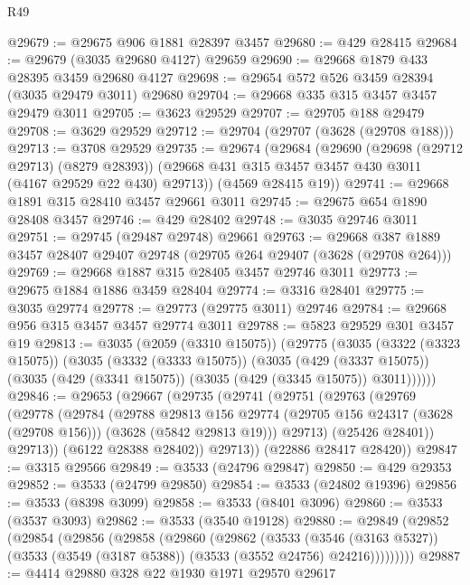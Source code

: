 \begin{lexlean}{R49}
\begin{coremodule}
@29679 := @29675 @906 @1881 @28397 @3457
@29680 := @429 @28415
@29684 := @29679 (@3035 @29680 @4127) @29659
@29690 := @29668 @1879 @433 @28395 @3459 @29680 @4127
@29698 := @29654 @572 @526 @3459 @28394 (@3035 @29479 @3011) @29680
@29704 := @29668 @335 @315 @3457 @3457 @29479 @3011
@29705 := @3623 @29529
@29707 := @29705 @188 @29479
@29708 := @3629 @29529
@29712 := @29704 (@29707 (@3628 (@29708 @188)))
@29713 := @3708 @29529
@29735 := @29674
    (@29684
      (@29690
        (@29698 (@29712 @29713) (@8279 @28393))
        (@29668 @431 @315 @3457 @3457 @430 @3011 (@4167 @29529 @22 @430) @29713))
      (@4569 @28415 @19))
@29741 := @29668 @1891 @315 @28410 @3457 @29661 @3011
@29745 := @29675 @654 @1890 @28408 @3457
@29746 := @429 @28402
@29748 := @3035 @29746 @3011
@29751 := @29745 (@29487 @29748) @29661
@29763 := @29668 @387 @1889 @3457 @28407 @29407 @29748 (@29705 @264 @29407 (@3628 (@29708 @264)))
@29769 := @29668 @1887 @315 @28405 @3457 @29746 @3011
@29773 := @29675 @1884 @1886 @3459 @28404
@29774 := @3316 @28401
@29775 := @3035 @29774
@29778 := @29773 (@29775 @3011) @29746
@29784 := @29668 @956 @315 @3457 @3457 @29774 @3011
@29788 := @5823 @29529 @301 @3457 @19
@29813 := @3035
    (@2059 (@3310 @15075))
    (@29775
      (@3035
        (@3322 (@3323 @15075))
        (@3035
          (@3332 (@3333 @15075))
          (@3035
            (@429 (@3337 @15075))
            (@3035 (@429 (@3341 @15075)) (@3035 (@429 (@3345 @15075)) @3011))))))
@29846 := @29653
    (@29667
      (@29735
        (@29741
          (@29751
            (@29763
              (@29769
                (@29778
                  (@29784
                    (@29788
                      @29813
                      @156
                      @29774
                      (@29705 @156 @24317 (@3628 (@29708 @156)))
                      (@3628 (@5842 @29813 @19)))
                    @29713)
                  (@25426 @28401))
                @29713))
            (@6122 @28388 @28402))
          @29713))
      (@22886 @28417 @28420))
@29847 := @3315 @29566
@29849 := @3533 (@24796 @29847)
@29850 := @429 @29353
@29852 := @3533 (@24799 @29850)
@29854 := @3533 (@24802 @19396)
@29856 := @3533 (@8398 @3099)
@29858 := @3533 (@8401 @3096)
@29860 := @3533 (@3537 @3093)
@29862 := @3533 (@3540 @19128)
@29880 := @29849
    (@29852
      (@29854
        (@29856
          (@29858
            (@29860
              (@29862
                (@3533
                  (@3546 (@3163 @5327))
                  (@3533 (@3549 (@3187 @5388)) (@3533 (@3552 @24756) @24216)))))))))
@29887 := @4414 @29880 @328 @22 @1930 @1971 @29570 @29617

\end{coremodule}
\end{lexlean}
